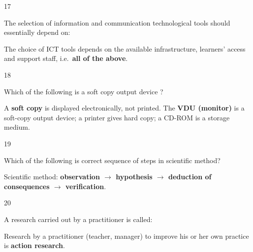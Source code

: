 \begin{question}{17}
{The selection of information and communication technological tools should essentially depend on:\par}
\begin{explain}
The choice of ICT tools depends on the available infrastructure, learners' access and support staff, i.e.\ \textbf{all of the above}.
\end{explain}
\end{question}

\begin{question}{18}
{Which of the following is a soft copy output device ?\par}
\begin{explain}
A \textbf{soft copy} is displayed electronically, not printed. The \textbf{VDU (monitor)} is a soft-copy output device; a printer gives hard copy; a CD-ROM is a storage medium.
\end{explain}
\end{question}

\begin{question}{19}
{Which of the following is correct sequence of steps in scientific method?\par}
\begin{explain}
Scientific method: \textbf{observation $\rightarrow$ hypothesis $\rightarrow$ deduction of consequences $\rightarrow$ verification}.
\end{explain}
\end{question}

\begin{question}{20}
{A research carried out by a practitioner is called:\par}
\begin{explain}
Research by a practitioner (teacher, manager) to improve his or her own practice is \textbf{action research}.
\end{explain}
\end{question}


